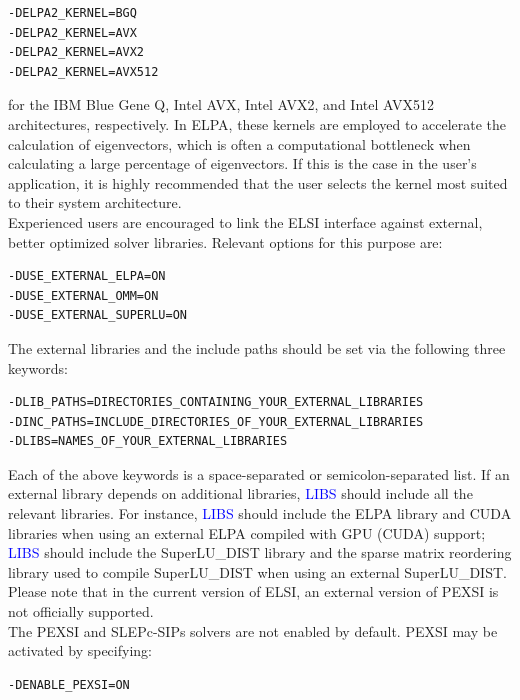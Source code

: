 \documentclass{report}
\begin{document}
\begin{verbatim}
-DELPA2_KERNEL=BGQ
-DELPA2_KERNEL=AVX
-DELPA2_KERNEL=AVX2
-DELPA2_KERNEL=AVX512
\end{verbatim}

for the IBM Blue Gene Q, Intel AVX, Intel AVX2, and Intel AVX512 architectures, respectively.  In ELPA, these kernels are employed to accelerate the calculation of eigenvectors, which is often a computational bottleneck when calculating a large percentage of eigenvectors.  If this is the case in the user's application, it is highly recommended that the user selects the kernel most suited to their system architecture.\\

Experienced users are encouraged to link the ELSI interface against external, better optimized solver libraries.  Relevant options for this purpose are:\\

\begin{verbatim}
-DUSE_EXTERNAL_ELPA=ON
-DUSE_EXTERNAL_OMM=ON
-DUSE_EXTERNAL_SUPERLU=ON
\end{verbatim}

The external libraries and the include paths should be set via the following three keywords:\\

\begin{verbatim}
-DLIB_PATHS=DIRECTORIES_CONTAINING_YOUR_EXTERNAL_LIBRARIES
-DINC_PATHS=INCLUDE_DIRECTORIES_OF_YOUR_EXTERNAL_LIBRARIES
-DLIBS=NAMES_OF_YOUR_EXTERNAL_LIBRARIES
\end{verbatim}

Each of the above keywords is a space-separated or semicolon-separated list.  If an external library depends on additional libraries, \textcolor{blue}{LIBS} should include all the relevant libraries.  For instance, \textcolor{blue}{LIBS} should include the ELPA library and CUDA libraries when using an external ELPA compiled with GPU (CUDA) support; \textcolor{blue}{LIBS} should include the SuperLU\_DIST library and the sparse matrix reordering library used to compile SuperLU\_DIST when using an external SuperLU\_DIST.  Please note that in the current version of ELSI, an external version of PEXSI is not officially supported.\\

The PEXSI and SLEPc-SIPs solvers are not enabled by default.  PEXSI may be activated by specifying:\\

\begin{verbatim}
-DENABLE_PEXSI=ON
\end{verbatim}
\end{document}
